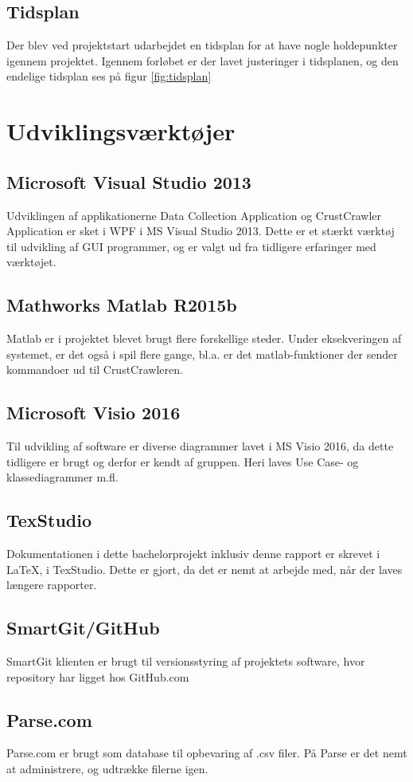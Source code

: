 \subsection{Tidsplan}
\label{sec:tidsplan}
Der blev ved projektstart udarbejdet en tidsplan for at have nogle holdepunkter igennem projektet. Igennem forløbet er der lavet justeringer i tidsplanen, og den endelige tidsplan ses på figur \ref{fig:tidsplan}


\section{Udviklingsværktøjer}
\label{sec:Udviklingsvaerktojer}

\subsection*{Microsoft Visual Studio 2013}
Udviklingen af applikationerne Data Collection Application og CrustCrawler Application er sket i WPF i MS Visual Studio 2013. Dette er et stærkt værktøj til udvikling af GUI programmer, og er valgt ud fra tidligere erfaringer med værktøjet.

\subsection*{Mathworks Matlab R2015b}
Matlab er i projektet blevet brugt flere forskellige steder. Under eksekveringen af systemet, er det også i spil flere gange, bl.a. er det matlab-funktioner der sender kommandoer ud til CrustCrawleren.

\subsection*{Microsoft Visio 2016}

Til udvikling af software er diverse diagrammer lavet i MS Visio 2016, da dette tidligere er brugt og derfor er kendt af gruppen. Heri laves Use Case- og klassediagrammer m.fl.

\subsection*{TexStudio}
Dokumentationen i dette bachelorprojekt inklusiv denne rapport er skrevet i \LaTeX, i TexStudio. Dette er gjort, da det er nemt at arbejde med, når der laves længere rapporter.

\subsection*{SmartGit/GitHub}
SmartGit klienten\citep{smartgit} er brugt til versionsstyring af projektets software, hvor repository har ligget hos GitHub.com\citep{github}

\subsection*{Parse.com}
Parse.com \citep{RefWorks:11} er brugt som database til opbevaring af .csv filer. På Parse er det nemt at administrere, og udtrække filerne igen.